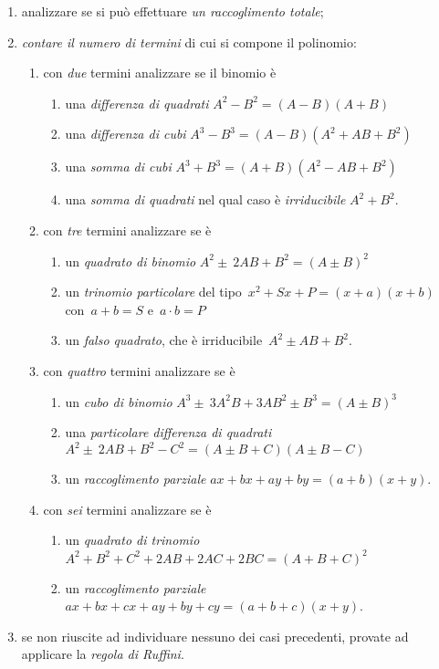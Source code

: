 \begin{enumerate}
\item analizzare se si può effettuare \emph{un raccoglimento totale};
\item \emph{contare il numero di termini} di cui si compone il polinomio:
 \begin{enumerate}
  \item con \emph{due} termini analizzare se il binomio è
   \begin{enumerate}
	\item una \emph{differenza di quadrati} 
	 $A^{2}-B^{2}=(A-B)(A+B)$
	\item una \emph{differenza di cubi}
	 $A^{3}-B^{3}=(A-B)\left(A^{2}+AB+B^{2}\right)$
	\item una \emph{somma di cubi} 
	 $A^{3}+B^{3}=(A+B)\left(A^{2}-AB+B^{2}\right)$
	\item una \emph{somma di quadrati} nel qual caso è \emph{irriducibile} 
	 $A^{2}+B^{2}$.
   \end{enumerate}
  \item con \emph{tre} termini analizzare se è
   \begin{enumerate}
	\item un \emph{quadrato di binomio} 
	 $A^{2}\pm~2AB+B^{2}=\left(A\pm B\right)^{2}$
	\item un \emph{trinomio particolare} del tipo~$x^{2}+Sx+P=(x+a)(x+b)$ 
	 con~$a+b=S$ e~$a\cdot b=P$
	\item un \emph{falso quadrato}, che è irriducibile~$A^{2}\pm AB+B^{2}$.
   \end{enumerate}
  \item con \emph{quattro} termini analizzare se è
   \begin{enumerate}
	\item un \emph{cubo di binomio} 
	 $A^{3}\pm~3A^{2}B+3AB^{2}\pm B^{3}=\left(A\pm B\right)^{3}$
	\item una \emph{particolare differenza di quadrati}
	 \subitem $A^{2}\pm~2AB+B^{2}-C^{2}=(A\pm B+C)(A\pm B-C)$
	\item un \emph{raccoglimento parziale} $ax+bx+ay+by=(a+b)(x+y)$.
   \end{enumerate}
  \item con \emph{sei} termini analizzare se è
   \begin{enumerate}
	\item un \emph{quadrato di trinomio} 
	 $A^{2}+B^{2}+C^{2}+2AB+2{AC}+2{BC}=\left(A+B+C\right)^{2}$
	\item un \emph{raccoglimento parziale}
	 \subitem $ax+{bx}+{cx}+{ay}+{by}+{cy}=(a+b+c)(x+y)$.
   \end{enumerate}
  \end{enumerate}
 \item se non riuscite ad individuare nessuno dei casi precedenti, provate ad 
  applicare la \emph{regola di Ruffini}.
\end{enumerate}


